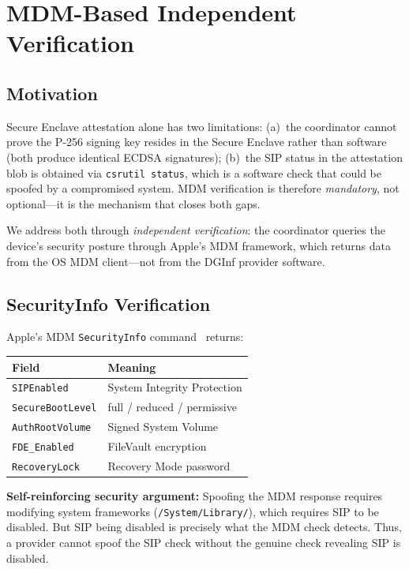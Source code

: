 \documentclass[10pt,twocolumn,letterpaper]{article}
\begin{document}
\section{MDM-Based Independent Verification}

\subsection{Motivation}

Secure Enclave attestation alone has two limitations: (a)~the coordinator cannot prove the P-256 signing key resides in the Secure Enclave rather than software (both produce identical ECDSA signatures); (b)~the SIP status in the attestation blob is obtained via \texttt{csrutil status}, which is a software check that could be spoofed by a compromised system. MDM verification is therefore \emph{mandatory}, not optional---it is the mechanism that closes both gaps.

We address both through \emph{independent verification}: the coordinator queries the device's security posture through Apple's MDM framework, which returns data from the OS MDM client---not from the DGInf provider software.

\subsection{SecurityInfo Verification}

Apple's MDM \texttt{SecurityInfo} command~\cite{apple-mdm} returns:

\begin{table}[h]
\centering
\small
\begin{tabular}{@{}ll@{}}
\toprule
\textbf{Field} & \textbf{Meaning} \\
\midrule
\texttt{SIPEnabled} & System Integrity Protection \\
\texttt{SecureBootLevel} & full / reduced / permissive \\
\texttt{AuthRootVolume} & Signed System Volume \\
\texttt{FDE\_Enabled} & FileVault encryption \\
\texttt{RecoveryLock} & Recovery Mode password \\
\bottomrule
\end{tabular}
\end{table}

\textbf{Self-reinforcing security argument:} Spoofing the MDM response requires modifying system frameworks (\texttt{/System/Library/}), which requires SIP to be disabled. But SIP being disabled is precisely what the MDM check detects. Thus, a provider cannot spoof the SIP check without the genuine check revealing SIP is disabled.
\end{document}
